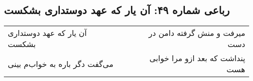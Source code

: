 \begin{center}
\section*{رباعی شماره ۴۹: آن یار که عهد دوستداری بشکست}
\label{sec:sh049}
\begin{longtable}{l p{0.5cm} r}
آن یار که عهد دوستداری بشکست
&&
میرفت و منش گرفته دامن در دست
\\
می‌گفت دگر باره به خواب‌م بینی
&&
پنداشت که بعد ازو مرا خوابی هست
\\
\end{longtable}
\end{center}
